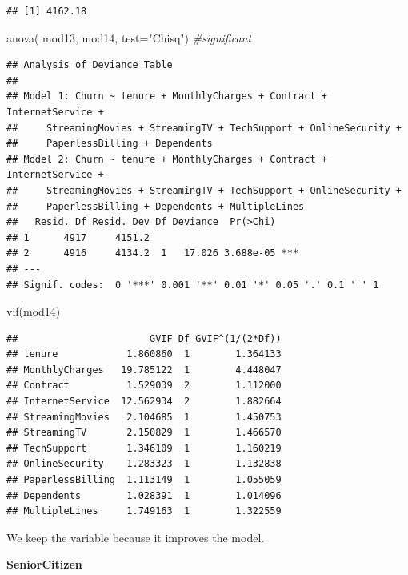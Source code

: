 \documentclass[
  twoside]{article}
\newenvironment{Shaded}{\begin{snugshade}}{\end{snugshade}}
\newcommand{\AttributeTok}[1]{\textcolor[rgb]{0.77,0.63,0.00}{#1}}
\newcommand{\CommentTok}[1]{\textcolor[rgb]{0.56,0.35,0.01}{\textit{#1}}}
\newcommand{\FunctionTok}[1]{\textcolor[rgb]{0.00,0.00,0.00}{#1}}
\newcommand{\NormalTok}[1]{#1}
\newcommand{\StringTok}[1]{\textcolor[rgb]{0.31,0.60,0.02}{#1}}
\begin{document}
\begin{verbatim}
## [1] 4162.18
\end{verbatim}

\begin{Shaded}
\begin{Highlighting}[]
\FunctionTok{anova}\NormalTok{( mod13, mod14,  }\AttributeTok{test=}\StringTok{"Chisq"}\NormalTok{) }\CommentTok{\#significant}
\end{Highlighting}
\end{Shaded}

\begin{verbatim}
## Analysis of Deviance Table
## 
## Model 1: Churn ~ tenure + MonthlyCharges + Contract + InternetService + 
##     StreamingMovies + StreamingTV + TechSupport + OnlineSecurity + 
##     PaperlessBilling + Dependents
## Model 2: Churn ~ tenure + MonthlyCharges + Contract + InternetService + 
##     StreamingMovies + StreamingTV + TechSupport + OnlineSecurity + 
##     PaperlessBilling + Dependents + MultipleLines
##   Resid. Df Resid. Dev Df Deviance  Pr(>Chi)    
## 1      4917     4151.2                          
## 2      4916     4134.2  1   17.026 3.688e-05 ***
## ---
## Signif. codes:  0 '***' 0.001 '**' 0.01 '*' 0.05 '.' 0.1 ' ' 1
\end{verbatim}

\begin{Shaded}
\begin{Highlighting}[]
\FunctionTok{vif}\NormalTok{(mod14)}
\end{Highlighting}
\end{Shaded}

\begin{verbatim}
##                       GVIF Df GVIF^(1/(2*Df))
## tenure            1.860860  1        1.364133
## MonthlyCharges   19.785122  1        4.448047
## Contract          1.529039  2        1.112000
## InternetService  12.562934  2        1.882664
## StreamingMovies   2.104685  1        1.450753
## StreamingTV       2.150829  1        1.466570
## TechSupport       1.346109  1        1.160219
## OnlineSecurity    1.283323  1        1.132838
## PaperlessBilling  1.113149  1        1.055059
## Dependents        1.028391  1        1.014096
## MultipleLines     1.749163  1        1.322559
\end{verbatim}

We keep the variable because it improves the model.

\textbf{SeniorCitizen}
\end{document}
